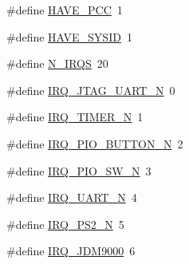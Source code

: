 \begin{DoxyCompactItemize}
\#define \hyperlink{nios2f-de2-70_8h_ac7fe8c276f438abaf08de1f86d68a191}{\-H\-A\-V\-E\-\_\-\-P\-C\-C}~1
\item 
\#define \hyperlink{nios2f-de2-70_8h_ab1d56f432cdfc6e0ea1581843a889240}{\-H\-A\-V\-E\-\_\-\-S\-Y\-S\-I\-D}~1
\item 
\#define \hyperlink{nios2f-de2-70_8h_ab76079c0049cc06f686c6d134b61fc82}{\-N\-\_\-\-I\-R\-Q\-S}~20
\item 
\#define \hyperlink{nios2f-de2-70_8h_ac13cf8ae2cd8c4d11f57dbfa979c6b78}{\-I\-R\-Q\-\_\-\-J\-T\-A\-G\-\_\-\-U\-A\-R\-T\-\_\-\-N}~0
\item 
\#define \hyperlink{nios2f-de2-70_8h_a61551a457fd728e5f088ea431b553f78}{\-I\-R\-Q\-\_\-\-T\-I\-M\-E\-R\-\_\-\-N}~1
\item 
\#define \hyperlink{nios2f-de2-70_8h_ae0705d111695d92747b469c748b5fc8a}{\-I\-R\-Q\-\_\-\-P\-I\-O\-\_\-\-B\-U\-T\-T\-O\-N\-\_\-\-N}~2
\item 
\#define \hyperlink{nios2f-de2-70_8h_aa6766edce343dece6c5ad833dfeb6682}{\-I\-R\-Q\-\_\-\-P\-I\-O\-\_\-\-S\-W\-\_\-\-N}~3
\item 
\#define \hyperlink{nios2f-de2-70_8h_aaa0ffdfaac63e670b0ef899ce6467773}{\-I\-R\-Q\-\_\-\-U\-A\-R\-T\-\_\-\-N}~4
\item 
\#define \hyperlink{nios2f-de2-70_8h_a7d03b2664ff9476bcdbd9eed8dffc6c7}{\-I\-R\-Q\-\_\-\-P\-S2\-\_\-\-N}~5
\item 
\#define \hyperlink{nios2f-de2-70_8h_ad928b6384d336eee6c6974e14d04caff}{\-I\-R\-Q\-\_\-\-J\-D\-M9000}~6
\end{DoxyCompactItemize}


